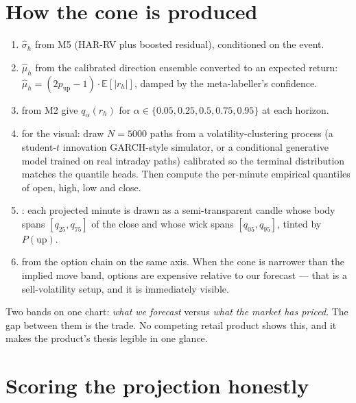 \section{How the cone is produced}

\begin{enumerate}
\item {} $\hat\sigma_h$ from M5 (HAR-RV plus boosted
residual), conditioned on the event.
\item {} $\hat\mu_h$ from the calibrated direction ensemble
converted to an expected return: $\hat\mu_h = (2p_{\text{up}}-1)\cdot
\mathbb{E}[|r_h|]$, damped by the meta-labeller's confidence.
\item {} from M2 give $q_\alpha(r_h)$ for
$\alpha \in \{0.05,0.25,0.5,0.75,0.95\}$ at each horizon.
\item {} for the visual: draw $N=5000$ paths from a
volatility-clustering process (a student-$t$ innovation GARCH-style simulator, or
a conditional generative model trained on real intraday paths) calibrated so the
terminal distribution matches the quantile heads. Then compute the per-minute
empirical quantiles of open, high, low and close.
\item {}: each projected minute is drawn as a semi-transparent
candle whose body spans $[q_{25}, q_{75}]$ of the close and whose wick spans
$[q_{05}, q_{95}]$, tinted by $P(\text{up})$.
\item {} from the option chain on the same axis.
When the cone is narrower than the implied move band, options are expensive
relative to our forecast --- that is a sell-volatility setup, and it is
immediately visible.
\end{enumerate}

\begin{keybox}[title={The killer visual}]
Two bands on one chart: \emph{what we forecast} versus \emph{what the market has
priced}. The gap between them is the trade. No competing retail product shows
this, and it makes the product's thesis legible in one glance.
\end{keybox}

\section{Scoring the projection honestly}


